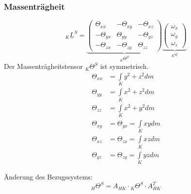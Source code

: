 \documentclass[a4paper,twocolumn,10pt]{article}
\begin{document}
\subsubsection{Massenträgheit}
\begin{equation*}
{}_K\underline{L}^S=\underbrace{\begin{pmatrix}\Theta_{xx} & -\Theta_{xy} & -\Theta_{xz} \\ -\Theta_{yx} & \Theta_{yy} & -\Theta_{yz} \\ -\Theta_{zx} & -\Theta_{zy} & \Theta_{zz}\end{pmatrix}}_{{}_K\Theta^S}\underbrace{\begin{pmatrix}\omega_x \\ \omega_y \\ \omega_z\end{pmatrix}}_{{}_K\underline{\omega}}
\end{equation*}
Der Massenträgheitstensor ${}_K\Theta^S$ ist symmetrisch.
\begin{equation*}
\begin{split}
\Theta_{xx}&=\int\limits_Ky^2+z^2dm\\
\Theta_{yy}&=\int\limits_Kx^2+z^2dm\\
\Theta_{zz}&=\int\limits_Kx^2+y^2dm\\
\Theta_{xy}&=\Theta_{yx}=\int\limits_Kxydm\\
\Theta_{xz}&=\Theta_{zx}=\int\limits_Kxzdm\\
\Theta_{yz}&=\Theta_{zy}=\int\limits_Kyzdm
\end{split}
\end{equation*}

Änderung des Bezugssystems:
\begin{equation*}
{}_H\Theta^S=A_{HK}\cdot {}_K\Theta^S\cdot A_{HK}^T
\end{equation*}
\end{document}
